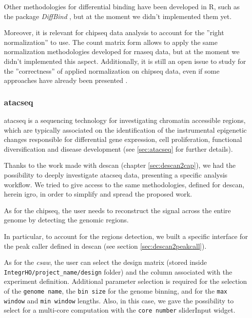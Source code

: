 Other methodologies for differential binding have been developed in R, such as the package \textit{DiffBind} \cite{Ross-Innes2012}, but at the moment we didn't implemented them yet.

Moreover, it is relevant for \gls{chipseq} data analysis to account for the ''right normalization'' to use.
The count matrix form allows to apply the same normalization methodologies developed for \gls{rnaseq} data, but at the moment we didn't implemented this aspect.
Additionally, it is still an open issue to study for the ''correctness'' of applied normalization on \gls{chipseq} data, even if some approaches have already been presented \cite{Angelini2015}.


\subsubsection{\gls{atacseq}} \label{sec:integrhoatac}

\gls{atacseq} is a sequencing technology for investigating chromatin accessible regions, which are typically associated on the identification of the instrumental epigenetic changes responsible for differential gene expression, cell proliferation, functional diversification and disease development (see \ref{sec:atacseq} for further details).

Thanks to the work made with \gls{descan} (chapter \ref{sec:descan2cap}), we had the possibility to deeply investigate \gls{atacseq} data, presenting a specific analysis workflow.
We tried to give access to the same methodologies, defined for \gls{descan}, herein \gls{igro}, in order to simplify and spread the proposed work.

As for the \gls{chipseq}, the user needs to reconstruct the signal across the entire genome by detecting the genomic regions.

In particular, to account for the regions detection, we built a specific interface for the peak caller defined in \gls{descan} (see section \ref{sec:descan2peakcall}).

As for the \textit{csaw}, the user can select the design matrix (stored inside \lstinline!IntegrHO/project_name/design! folder) and the column associated with the experiment definition.
Additional parameter selection is required for the selection of the \lstinline!genome name!, the \lstinline!bin size! for the genome binning, and for the \lstinline!max window! and \lstinline!min window! lengths.
Also, in this case, we gave the possibility to select for a multi-core computation with the \lstinline!core number! sliderInput widget.

